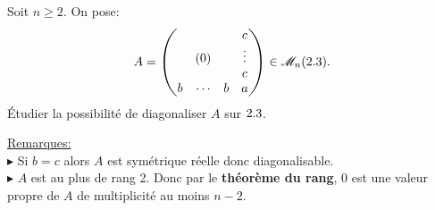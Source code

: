 \begin{exercice}
    Soit $n \geqslant 2$. On pose:
    $$
    A = 
        \begin{pmatrix}
              &        &   & c \\
              &  (0)   &   & \vdots \\
              &        &   & c \\
            b & \cdots & b & a
        \end{pmatrix}
        \in \mathscr{M}_n(2.3).
    $$
    Étudier la possibilité de diagonaliser $A$ sur $2.3$.
\end{exercice}

\underline{Remarques:}\\
$\blacktriangleright$ Si $b = c$ alors $A$ est symétrique réelle donc diagonalisable. \\
$\blacktriangleright$ $A$ est au plus de rang 2. Donc par le \textbf{théorème du rang}, 0 est une valeur propre de $A$ de multiplicité au moins $n-2$.